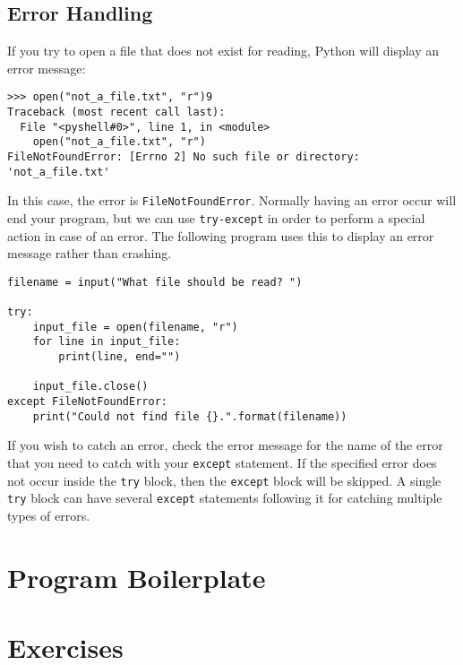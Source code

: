 \documentclass[11pt]{cselabheader}
\begin{document}
\subsection{Error Handling}
If you try to open a file that does not exist for reading, Python will display an error message:

\begin{lstlisting}[style=ipython]
>>> open("not_a_file.txt", "r")9
Traceback (most recent call last):
  File "<pyshell#0>", line 1, in <module>
    open("not_a_file.txt", "r")
FileNotFoundError: [Errno 2] No such file or directory: 'not_a_file.txt'
\end{lstlisting}

In this case, the error is \lstinline{FileNotFoundError}. Normally having an error occur will end your program, but we can use \lstinline{try-except} in order to perform a special action in case of an error. The following program uses this to display an error message rather than crashing.

\begin{lstlisting}[style=python]
filename = input("What file should be read? ")

try:
    input_file = open(filename, "r")
    for line in input_file:
        print(line, end="")

    input_file.close()
except FileNotFoundError:
    print("Could not find file {}.".format(filename))
\end{lstlisting}

If you wish to catch an error, check the error message for the name of the error that you need to catch with your \lstinline{except} statement. If the specified error does not occur inside the \lstinline{try} block, then the \lstinline{except} block will be skipped. A single \lstinline{try} block can have several \lstinline{except} statements following it for catching multiple types of errors.

\section{Program Boilerplate}




\section{Exercises}
\label{sec:ex}
\end{document}
